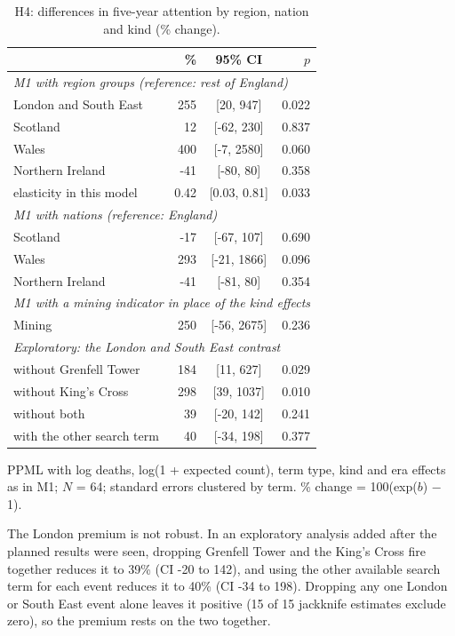 \documentclass[11pt,a4paper]{article}
\begin{document}
\begin{table}[tbp]\centering\small\begin{threeparttable}\caption{H4: differences in five-year attention by region, nation and kind (\% change).}\label{tab:groups}\begin{tabular}{lrcr}\toprule & \% & 95\% CI & $p$\\\midrule
\multicolumn{4}{l}{\textit{M1 with region groups (reference: rest of England)}}\\
London and South East & 255 & [20, 947] & 0.022\\
Scotland & 12 & [-62, 230] & 0.837\\
Wales & 400 & [-7, 2580] & 0.060\\
Northern Ireland & -41 & [-80, 80] & 0.358\\
\quad elasticity in this model & 0.42 & [0.03, 0.81] & 0.033\\
\multicolumn{4}{l}{\textit{M1 with nations (reference: England)}}\\
Scotland & -17 & [-67, 107] & 0.690\\
Wales & 293 & [-21, 1866] & 0.096\\
Northern Ireland & -41 & [-81, 80] & 0.354\\
\multicolumn{4}{l}{\textit{M1 with a mining indicator in place of the kind effects}}\\
Mining & 250 & [-56, 2675] & 0.236\\
\multicolumn{4}{l}{\textit{Exploratory: the London and South East contrast}}\\
without Grenfell Tower & 184 & [11, 627] & 0.029\\
without King's Cross & 298 & [39, 1037] & 0.010\\
without both & 39 & [-20, 142] & 0.241\\
with the other search term & 40 & [-34, 198] & 0.377\\
\bottomrule\end{tabular}\begin{tablenotes}\footnotesize\item PPML with log deaths, log(1 + expected count), term type, kind and era effects as in M1; $N$ = 64; standard errors clustered by term. \% change = 100(exp($b$) $-$ 1).\end{tablenotes}\end{threeparttable}\end{table}

The London premium is not robust. In an exploratory analysis added after the planned results were seen, dropping Grenfell Tower and the King's Cross fire together reduces it to 39\% (CI -20 to 142), and using the other available search term for each event reduces it to 40\% (CI -34 to 198). Dropping any one London or South East event alone leaves it positive (15 of 15 jackknife estimates exclude zero), so the premium rests on the two together.
\end{document}
